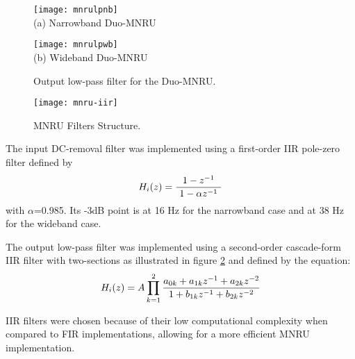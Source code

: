 \begin{figure}[hp]
  \begin{center}
    \texttt{[image: mnrulpnb]}
    \\
    (a) Narrowband Duo-MNRU

    \texttt{[image: mnrulpwb]}
    \\
    (b) Wideband Duo-MNRU
  \end{center}
  \caption{ Output low-pass filter for the Duo-MNRU. \label{MNRU:lp-filter} }
\end{figure}


\begin{figure}[htb]
  \begin{center}
    \texttt{[image: mnru-iir]}
  \end{center}
  \caption{MNRU Filters Structure.\label{MNRU-IIR}}
\end{figure}


The input DC-removal filter was implemented using a first-order IIR pole-zero filter defined by
\[
    H_i(z) = { 1-z^{-1} \over \ 1 - \alpha z^{-1} \ }
\]
with $\alpha$=0.985.
Its -3dB point is at 16 Hz for the narrowband case and at 38 Hz for the wideband case.

The output low-pass filter was implemented using a second-order cascade-form IIR filter with two-sections as illustrated
in figure \ref{MNRU-IIR} and defined by the equation:
\[
    H_i(z) = A \prod_{k=1}^{2}
                    { a_{0k}+a_{1k}z^{-1}+a_{2k}z^{-2} \over
                      \ 1+b_{1k}z^{-1}+b_{2k} z^{-2} \
                                }
\]

IIR filters were chosen because of their low computational complexity when compared to FIR implementations, allowing for
a more efficient MNRU implementation.


